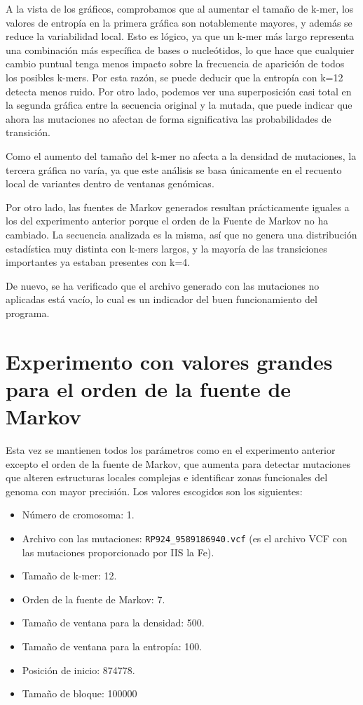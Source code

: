 \documentclass[11pt,spanish,listoffigures,listoftables]{tfgetsinf}
\begin{document}
A la vista de los gráficos, comprobamos que al aumentar el tamaño de k-mer, los valores de entropía en la primera gráfica son notablemente mayores, y además se reduce la variabilidad local. Esto es lógico, ya que un k-mer más largo representa una combinación más específica de bases o nucleótidos, lo que hace que cualquier cambio puntual tenga menos impacto sobre la frecuencia de aparición de todos los posibles k-mers. Por esta razón, se puede deducir que la entropía con k=12 detecta menos ruido. Por otro lado, podemos ver una superposición casi total en la segunda gráfica entre la secuencia original y la mutada, que puede indicar que ahora las mutaciones no afectan de forma significativa las probabilidades de transición. 

Como el aumento del tamaño del k-mer no afecta a la densidad de mutaciones, la tercera gráfica no varía, ya que este análisis se basa únicamente en el recuento local de variantes dentro de ventanas genómicas. 

Por otro lado, las fuentes de Markov generados resultan prácticamente iguales a los del experimento anterior porque el orden de la Fuente de Markov no ha cambiado. La secuencia analizada es la misma, así que no genera una distribución estadística muy distinta con k-mers largos, y la mayoría de las transiciones importantes ya estaban presentes con k=4.

De nuevo, se ha verificado que el archivo generado con las mutaciones no aplicadas está vacío, lo cual es un indicador del buen funcionamiento del programa.


\section{Experimento con valores grandes para el orden de la fuente de Markov}

Esta vez se mantienen todos los parámetros como en el experimento anterior excepto el orden de la fuente de Markov, que aumenta para detectar mutaciones que alteren estructuras locales complejas e identificar zonas funcionales del genoma con mayor precisión. Los valores escogidos son los siguientes:

\begin{itemize}
   \item Número de cromosoma: 1.
   \item Archivo con las mutaciones: \texttt{RP924\_9589186940.vcf}  (es el archivo \acs{VCF} con las mutaciones proporcionado por \acs{IIS} la Fe).
   \item Tamaño de k-mer: 12.
   \item Orden de la fuente de Markov: 7.
   \item Tamaño de ventana para la densidad: 500.
   \item Tamaño de ventana para la entropía: 100.
   \item Posición de inicio: 874778.
   \item Tamaño de bloque: 100000 
\end{itemize}
\end{document}
